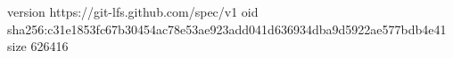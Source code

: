 version https://git-lfs.github.com/spec/v1
oid sha256:c31e1853fc67b30454ac78e53ae923add041d636934dba9d5922ae577bdb4e41
size 626416

